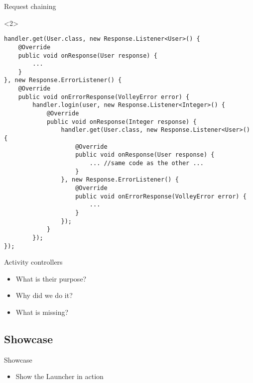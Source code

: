 \begin{frame}[fragile]{Request chaining}
\begin{onlyenv}<2>
\begin{center}
\begin{minipage}[H]{0.9\linewidth}
\begin{lstlisting}    
handler.get(User.class, new Response.Listener<User>() {
	@Override
    public void onResponse(User response) {
    	... 
    }
}, new Response.ErrorListener() {
	@Override
    public void onErrorResponse(VolleyError error) {
    	handler.login(user, new Response.Listener<Integer>() {
        	@Override
            public void onResponse(Integer response) {
            	handler.get(User.class, new Response.Listener<User>() {
                	@Override
                    public void onResponse(User response) {
                    	... //same code as the other ...
                    }
                }, new Response.ErrorListener() {
                    @Override
                    public void onErrorResponse(VolleyError error) {
						...
                    }
                });
            }
        });
});
\end{lstlisting} 
\end{minipage}
\end{center}
\end{onlyenv}
\end{frame}

\begin{frame}{Activity controllers}
\begin{itemize}
  \item What is their purpose?
  \item Why did we do it?
  \item What is missing?
\end{itemize}
\end{frame}

\subsection{Showcase}
\begin{frame}{Showcase}
\begin{itemize}
  \item Show the Launcher in action
\end{itemize}
\end{frame}
